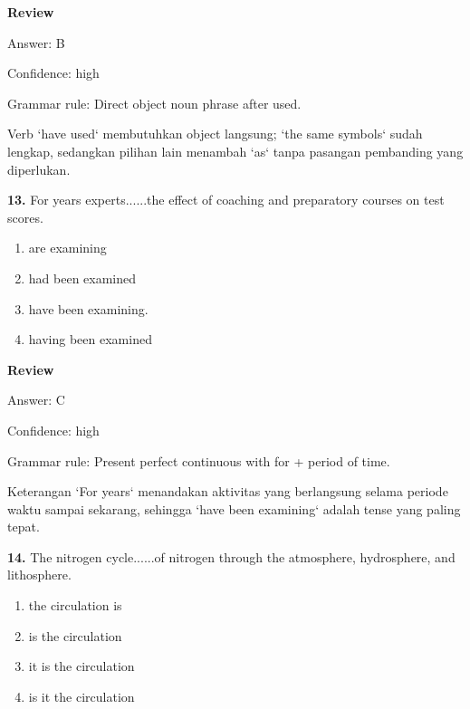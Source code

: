 \documentclass[12pt]{article}
\begin{document}
\par
\begingroup
\setlength{\parskip}{0pt}
\setlength{\parindent}{0pt}
\textbf{Review}\par
Answer: B\par
Confidence: high\par
Grammar rule: Direct object noun phrase after used.\par
Verb `have used` membutuhkan object langsung; `the same symbols` sudah lengkap, sedangkan pilihan lain menambah `as` tanpa pasangan pembanding yang diperlukan.\par
\endgroup
\par
\vspace{0.25\baselineskip}
\noindent\textbf{13.} For years experts......the effect of coaching and preparatory courses on test scores.
\begin{enumerate}[label=(\Alph*),leftmargin=*,itemsep=0.2em]
\item are examining
\item had been examined
\item have been examining.
\item having been examined
\end{enumerate}
\par
\begingroup
\setlength{\parskip}{0pt}
\setlength{\parindent}{0pt}
\textbf{Review}\par
Answer: C\par
Confidence: high\par
Grammar rule: Present perfect continuous with for + period of time.\par
Keterangan `For years` menandakan aktivitas yang berlangsung selama periode waktu sampai sekarang, sehingga `have been examining` adalah tense yang paling tepat.\par
\endgroup
\par
\vspace{0.25\baselineskip}
\noindent\textbf{14.} The nitrogen cycle......of nitrogen through the atmosphere, hydrosphere, and lithosphere.
\begin{enumerate}[label=(\Alph*),leftmargin=*,itemsep=0.2em]
\item the circulation is
\item is the circulation
\item it is the circulation
\item is it the circulation
\end{enumerate}
\par
\begingroup
\setlength{\parskip}{0pt}
\setlength{\parindent}{0pt}
\end{document}
